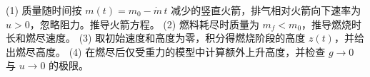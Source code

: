 (1) 质量随时间按 \(m(t)=m_0-\dot m\,t\) 减少的竖直火箭，排气相对火箭向下速率为 \(u>0\)，忽略阻力。推导火箭方程。
(2) 燃料耗尽时质量为 \(m_f<m_0\)，推导燃烧时长和燃尽速度。
(3) 取初始速度和高度为零，积分得燃烧阶段的高度 \(z(t)\)，并给出燃尽高度。
(4) 在燃尽后仅受重力的模型中计算额外上升高度，并检查 \(g\to0\) 与 \(u\to0\) 的极限。
